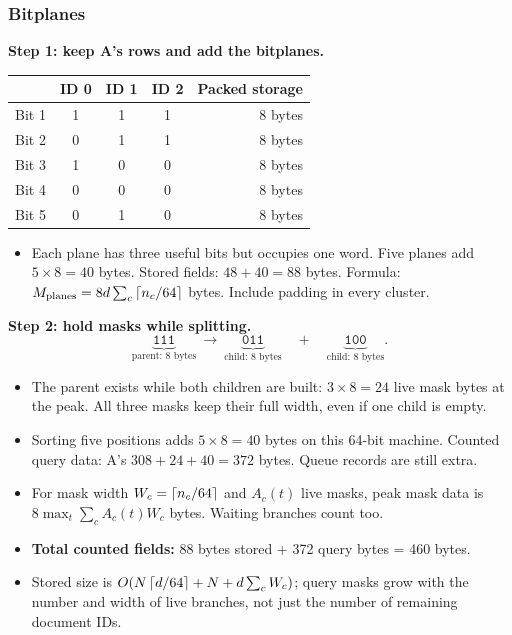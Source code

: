 \subsubsection{Bitplanes}
\textbf{Step 1: keep A's rows and add the bitplanes.}
\begin{center}\small
\begin{tabular}{c|ccc|r}
 & ID 0 & ID 1 & ID 2 & Packed storage\\\hline
Bit 1 &1&1&1&8 bytes\\
Bit 2 &0&1&1&8 bytes\\
Bit 3 &1&0&0&8 bytes\\
Bit 4 &0&0&0&8 bytes\\
Bit 5 &0&1&0&8 bytes
\end{tabular}\normalsize
\end{center}
\begin{itemize}
\item Each plane has three useful bits but occupies one word. Five planes add $5\times8=40$ bytes. Stored fields: $48+40=88$ bytes. Formula: $M_{\rm planes}=8d\sum_c\left\lceil n_c/64\right\rceil$ bytes. Include padding in every cluster.
\end{itemize}

\newpage
\textbf{Step 2: hold masks while splitting.}
\[
 \underbrace{\texttt{111}}_{\text{parent: 8 bytes}}
 \ \longrightarrow\
 \underbrace{\texttt{011}}_{\text{child: 8 bytes}}
 \quad+\quad
 \underbrace{\texttt{100}}_{\text{child: 8 bytes}}.
\]
\begin{itemize}
\item The parent exists while both children are built: $3\times8=24$ live mask bytes at the peak.
All three masks keep their full width, even if one child is empty.
\item Sorting five positions adds $5\times8=40$ bytes on this 64-bit machine. Counted query data: A's $308+24+40=372$ bytes. Queue records are still extra.
\item For mask width $W_c=\left\lceil n_c/64\right\rceil$ and $A_c(t)$ live masks, peak mask data is
$8\max_t\sum_c A_c(t)W_c$ bytes. Waiting branches count too.
\end{itemize}
\begin{itemize}
\item \textbf{Total counted fields:} 88 bytes stored + 372 query bytes = 460 bytes.
\item Stored size is $O(N\left\lceil d/64\right\rceil+N+d\sum_c W_c)$; query masks grow with the number and width of live branches, not just the number of remaining document IDs.
\end{itemize}

